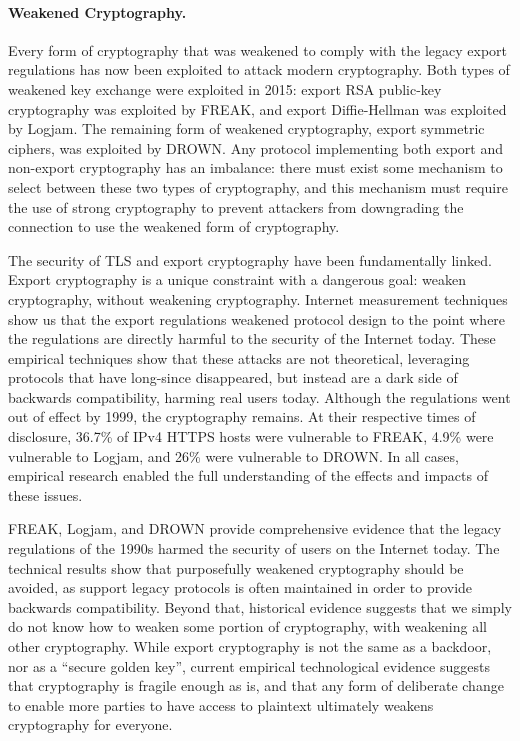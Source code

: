 \paragraph{Weakened Cryptography.}
Every form of cryptography that was weakened to comply with the legacy export
regulations has now been exploited to attack modern cryptography. Both types
of weakened key exchange were exploited in 2015: export RSA public-key
cryptography was exploited by FREAK, and export Diffie-Hellman was exploited
by Logjam. The remaining form of weakened cryptography, export symmetric
ciphers, was exploited by DROWN. Any protocol implementing both export and
non-export cryptography has an imbalance: there must exist some mechanism to
select between these two types of cryptography, and this mechanism must
require the use of strong cryptography to prevent attackers from downgrading
the connection to use the weakened form of cryptography.

The security of TLS and export cryptography have been fundamentally linked.
Export cryptography is a unique constraint with a dangerous goal: weaken
cryptography, without weakening cryptography. Internet measurement techniques
show us that the export regulations weakened protocol design to the point
where the regulations are directly harmful to the security of the Internet
today. These empirical techniques show that these attacks are not
theoretical, leveraging protocols that have long-since disappeared, but
instead are a dark side of backwards compatibility, harming real users today.
Although the regulations went out of effect by 1999, the cryptography
remains. At their respective times of disclosure, 36.7\% of IPv4 HTTPS hosts
were vulnerable to FREAK, 4.9\% were vulnerable to Logjam, and 26\% were
vulnerable to DROWN. In all cases, empirical research enabled the full
understanding of the effects and impacts of these issues.

FREAK, Logjam, and DROWN provide comprehensive evidence that the legacy
regulations of the 1990s harmed the security of users on the Internet today.
The technical results show that purposefully weakened cryptography should
be avoided, as support legacy protocols is often maintained in order to
provide backwards compatibility. Beyond that, historical evidence suggests
that we simply do not know how to weaken some portion of cryptography, with
weakening all other cryptography. While export cryptography is not the same
as a backdoor, nor as a “secure golden key”, current empirical technological
evidence suggests that cryptography is fragile enough as is, and that any
form of deliberate change to enable more parties to have access to plaintext
ultimately weakens cryptography for everyone.

